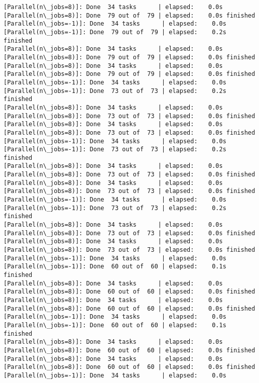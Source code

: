 \documentclass[11pt]{article}
\begin{document}
\begin{Verbatim}[commandchars=\\\{\}]
[Parallel(n\_jobs=8)]: Done  34 tasks      | elapsed:    0.0s
[Parallel(n\_jobs=8)]: Done  79 out of  79 | elapsed:    0.0s finished
[Parallel(n\_jobs=-1)]: Done  34 tasks      | elapsed:    0.0s
[Parallel(n\_jobs=-1)]: Done  79 out of  79 | elapsed:    0.2s finished
[Parallel(n\_jobs=8)]: Done  34 tasks      | elapsed:    0.0s
[Parallel(n\_jobs=8)]: Done  79 out of  79 | elapsed:    0.0s finished
[Parallel(n\_jobs=8)]: Done  34 tasks      | elapsed:    0.0s
[Parallel(n\_jobs=8)]: Done  79 out of  79 | elapsed:    0.0s finished
[Parallel(n\_jobs=-1)]: Done  34 tasks      | elapsed:    0.0s
[Parallel(n\_jobs=-1)]: Done  73 out of  73 | elapsed:    0.2s finished
[Parallel(n\_jobs=8)]: Done  34 tasks      | elapsed:    0.0s
[Parallel(n\_jobs=8)]: Done  73 out of  73 | elapsed:    0.0s finished
[Parallel(n\_jobs=8)]: Done  34 tasks      | elapsed:    0.0s
[Parallel(n\_jobs=8)]: Done  73 out of  73 | elapsed:    0.0s finished
[Parallel(n\_jobs=-1)]: Done  34 tasks      | elapsed:    0.0s
[Parallel(n\_jobs=-1)]: Done  73 out of  73 | elapsed:    0.2s finished
[Parallel(n\_jobs=8)]: Done  34 tasks      | elapsed:    0.0s
[Parallel(n\_jobs=8)]: Done  73 out of  73 | elapsed:    0.0s finished
[Parallel(n\_jobs=8)]: Done  34 tasks      | elapsed:    0.0s
[Parallel(n\_jobs=8)]: Done  73 out of  73 | elapsed:    0.0s finished
[Parallel(n\_jobs=-1)]: Done  34 tasks      | elapsed:    0.0s
[Parallel(n\_jobs=-1)]: Done  73 out of  73 | elapsed:    0.2s finished
[Parallel(n\_jobs=8)]: Done  34 tasks      | elapsed:    0.0s
[Parallel(n\_jobs=8)]: Done  73 out of  73 | elapsed:    0.0s finished
[Parallel(n\_jobs=8)]: Done  34 tasks      | elapsed:    0.0s
[Parallel(n\_jobs=8)]: Done  73 out of  73 | elapsed:    0.0s finished
[Parallel(n\_jobs=-1)]: Done  34 tasks      | elapsed:    0.0s
[Parallel(n\_jobs=-1)]: Done  60 out of  60 | elapsed:    0.1s finished
[Parallel(n\_jobs=8)]: Done  34 tasks      | elapsed:    0.0s
[Parallel(n\_jobs=8)]: Done  60 out of  60 | elapsed:    0.0s finished
[Parallel(n\_jobs=8)]: Done  34 tasks      | elapsed:    0.0s
[Parallel(n\_jobs=8)]: Done  60 out of  60 | elapsed:    0.0s finished
[Parallel(n\_jobs=-1)]: Done  34 tasks      | elapsed:    0.0s
[Parallel(n\_jobs=-1)]: Done  60 out of  60 | elapsed:    0.1s finished
[Parallel(n\_jobs=8)]: Done  34 tasks      | elapsed:    0.0s
[Parallel(n\_jobs=8)]: Done  60 out of  60 | elapsed:    0.0s finished
[Parallel(n\_jobs=8)]: Done  34 tasks      | elapsed:    0.0s
[Parallel(n\_jobs=8)]: Done  60 out of  60 | elapsed:    0.0s finished
[Parallel(n\_jobs=-1)]: Done  34 tasks      | elapsed:    0.0s

\end{Verbatim}
\end{document}
